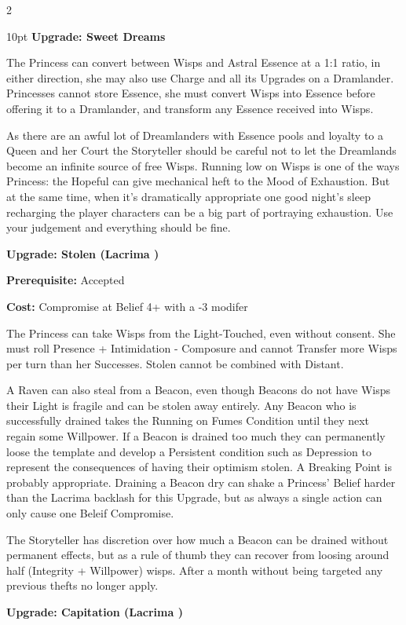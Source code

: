 \begin{multicols}{2}
\begin{myindentpar}{10pt}
\textbf{Upgrade: Sweet Dreams}

The Princess can convert between Wisps and Astral Essence at a 1:1 ratio, in either direction, she may also use Charge and all its Upgrades on a Dramlander. Princesses cannot store Essence, she must convert Wisps into Essence before offering it to a Dramlander, and transform any Essence received into Wisps.

As there are an awful lot of Dreamlanders with Essence pools and loyalty to a Queen and her Court the Storyteller should be careful not to let the Dreamlands become an infinite source of free Wisps. Running low on Wisps is one of the ways Princess: the Hopeful can give mechanical heft to the Mood of Exhaustion. But at the same time, when it's dramatically appropriate one good night's sleep recharging the player characters can be a big part of portraying exhaustion. Use your judgement and everything should be fine. 

\textbf{Upgrade: Stolen (Lacrima \textbullet\textbullet)}

\noindent \textbf{Prerequisite:} Accepted

\noindent \textbf{Cost:} Compromise at Belief 4+ with a -3 modifer

The Princess can take Wisps from the Light-Touched, even without consent. She must roll Presence + Intimidation - Composure and cannot Transfer more Wisps per turn than her Successes. Stolen cannot be combined with Distant. 

A Raven can also steal from a Beacon, even though Beacons do not have Wisps their Light is fragile and can be stolen away entirely. Any Beacon who is successfully drained takes the Running on Fumes Condition until they next regain some Willpower. If a Beacon is drained too much they can permanently loose the template and develop a Persistent condition such as Depression to represent the consequences of having their optimism stolen. A Breaking Point is probably appropriate. Draining a Beacon dry can shake a Princess' Belief harder than the Lacrima backlash for this Upgrade, but as always a single action can only cause one Beleif Compromise. 

The Storyteller has discretion over how much a Beacon can be drained without permanent effects, but as a rule of thumb they can recover from loosing around  half (Integrity + Willpower) wisps. After a month without being targeted any previous thefts no longer apply. 

\textbf{Upgrade: Capitation (Lacrima \textbullet\textbullet\textbullet)}


\end{myindentpar}
\end{multicols}
